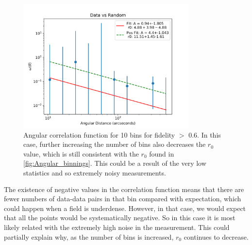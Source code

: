 \begin{figure}[!htbp]
\centering \includegraphics[width=90mm]{FINAL_Data_vs_Random_20000_bin10_sn0_6_NFalse.png}
\caption{Angular correlation function for 10 bins for fidelity $>$ 0.6. In this case, further increasing the number of bins also decreases the $r_0$ value, which is still consistent with the $r_0$ found in \ref{fig:Angular_binnings}. This could be a result of the very low statistics and so extremely noisy measurements.}
\label{fig:Angular_bin_5}
\end{figure}

The existence of negative values in the correlation function means that there are fewer numbers of data-data pairs in that bin compared with expectation, which could happen when a field is underdense. However, in that case, we would expect that all the points would be systematically negative. So in this case it is most likely related with the extremely high noise in the measurement. This could partially explain why, as the number of bins is increased, $r_0$ continues to decrease. 


